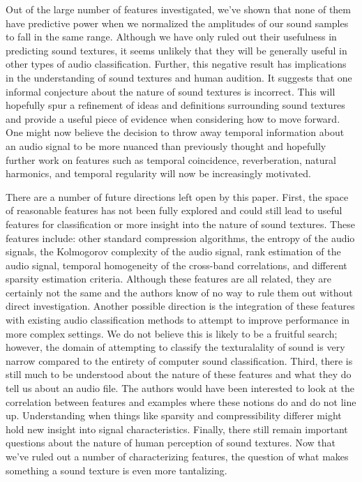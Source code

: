 \documentclass{sig-alternate-05-2015}
\begin{document}
Out of the large number of features investigated, we've shown that none of them have predictive power when we normalized the amplitudes of our sound samples to fall in the same range. Although we have only ruled out their usefulness in predicting sound textures, it seems unlikely that they will be generally useful in other types of audio classification. Further, this negative result has implications in the understanding of sound textures and human audition. It suggests that one informal conjecture about the nature of sound textures is incorrect. This will hopefully spur a refinement of ideas and definitions surrounding sound textures and provide a useful piece of evidence when considering how to move forward. One might now believe the decision to throw away temporal information about an audio signal to be more nuanced than previously thought and hopefully further work on features such as temporal coincidence, reverberation, natural harmonics, and temporal regularity will now be increasingly motivated.

There are a number of future directions left open by this paper. First, the space of reasonable features has not been fully explored and could still lead to useful features for classification or more insight into the nature of sound textures. These features include: other standard compression algorithms, the entropy of the audio signals, the Kolmogorov complexity of the audio signal, rank estimation of the audio signal, temporal homogeneity of the cross-band correlations, and different sparsity estimation criteria. Although these features are all related, they are certainly not the same and the authors know of no way to rule them out without direct investigation. Another possible direction is the integration of these features with existing audio classification methods to attempt to improve performance in more complex settings. We do not believe this is likely to be a fruitful search; however, the domain of attempting to classify the texturalality of sound is very narrow compared to the entirety of computer sound classification. Third, there is still much to be understood about the nature of these features and what they do tell us about an audio file. The authors would have been interested to look at the correlation between features and examples where these notions do and do not line up. Understanding when things like sparsity and compressibility differer might hold new insight into signal characteristics. Finally, there still remain important questions about the nature of human perception of sound textures. Now that we've ruled out a number of characterizing features, the question of what makes something a sound texture is even more tantalizing. 
\end{document}
